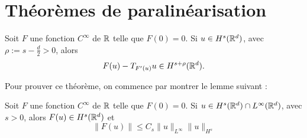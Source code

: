 \documentclass[11pt,a4paper]{article}
\begin{document}
\section{Théorèmes de paralinéarisation}

\begin{thm}\label{paralin}
Soit $F$ une fonction $C^{\infty}$ de $\mathbb R$ telle que $F(0)=0$. Si $u\in H^s(\mathbb R^d)$, avec $\rho := s - \frac{d}{2}>0 $, alors 
\begin{equation}
F(u) - T_{F'(u)}u \in H^{s+\rho}(\mathbb R^d).
\end{equation}
\end{thm}
Pour prouver ce théorème, on commence par montrer le lemme suivant : 

\begin{lemma}
Soit $F$ une fonction $C^{\infty}$ de $\mathbb R$ telle que $F(0)=0$. Si $u\in H^s(\mathbb R^d)\cap L^{\infty}(\mathbb R^d) $, avec $s>0 $, alors $F(u) \in H^s(\mathbb R^d)$ et 
\begin{equation}
\|F(u)\| \leq C_s \|u\|_{L^{\infty}} \|u\|_{H^s}
\end{equation}
\end{lemma}
\end{document}
